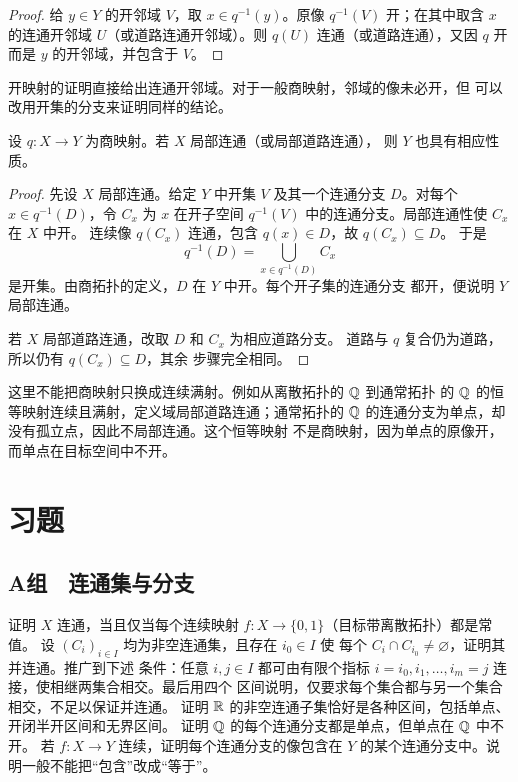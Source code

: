 \begin{proof}
给 \(y\in Y\) 的开邻域 \(V\)，取 \(x\in q^{-1}(y)\)。原像
\(q^{-1}(V)\) 开；在其中取含 \(x\) 的连通开邻域 \(U\)（或道路连通开邻域）。则 \(q(U)\) 连通（或道路连通），又因 \(q\) 开而是 \(y\) 的开邻域，并包含于 \(V\)。
\end{proof}

开映射的证明直接给出连通开邻域。对于一般商映射，邻域的像未必开，但
可以改用开集的分支来证明同样的结论。

\begin{theorem}[商映射保持局部连通性]
\label{thm:quotient-local-connectedness}
设 \(q:X\to Y\) 为商映射。若 \(X\) 局部连通（或局部道路连通），
则 \(Y\) 也具有相应性质。
\end{theorem}

\begin{proof}
先设 \(X\) 局部连通。给定 \(Y\) 中开集 \(V\) 及其一个连通分支
\(D\)。对每个 \(x\in q^{-1}(D)\)，令 \(C_x\) 为 \(x\) 在开子空间
\(q^{-1}(V)\) 中的连通分支。局部连通性使 \(C_x\) 在 \(X\) 中开。
连续像 \(q(C_x)\) 连通，包含 \(q(x)\in D\)，故 \(q(C_x)\subseteq D\)。
于是
\[
 q^{-1}(D)=\bigcup_{x\in q^{-1}(D)}C_x
\]
是开集。由商拓扑的定义，\(D\) 在 \(Y\) 中开。每个开子集的连通分支
都开，便说明 \(Y\) 局部连通。

若 \(X\) 局部道路连通，改取 \(D\) 和 \(C_x\) 为相应道路分支。
道路与 \(q\) 复合仍为道路，所以仍有 \(q(C_x)\subseteq D\)，其余
步骤完全相同。
\end{proof}

这里不能把商映射只换成连续满射。例如从离散拓扑的 \(\mathbb{Q}\) 到通常拓扑
的 \(\mathbb{Q}\) 的恒等映射连续且满射，定义域局部道路连通；通常拓扑的
\(\mathbb{Q}\) 的连通分支为单点，却没有孤立点，因此不局部连通。这个恒等映射
不是商映射，因为单点的原像开，而单点在目标空间中不开。

\section*{习题}

\subsection*{A组　连通集与分支}
\begin{enumerate}[label=\textbf{\thechapter.\arabic*.}]
 证明 \(X\) 连通，当且仅当每个连续映射 \(f:X\to\{0,1\}\)（目标带离散拓扑）都是常值。
 设 \((C_i)_{i\in I}\) 均为非空连通集，且存在 \(i_0\in I\) 使
 每个 \(C_i\cap C_{i_0}\ne\varnothing\)，证明其并连通。推广到下述
 条件：任意 \(i,j\in I\) 都可由有限个指标
 \(i=i_0,i_1,\ldots,i_m=j\) 连接，使相继两集合相交。最后用四个
 区间说明，仅要求每个集合都与另一个集合相交，不足以保证并连通。
 证明 \(\mathbb{R}\) 的非空连通子集恰好是各种区间，包括单点、开闭半开区间和无界区间。
 证明 \(\mathbb{Q}\) 的每个连通分支都是单点，但单点在 \(\mathbb{Q}\) 中不开。
 若 \(f:X\to Y\) 连续，证明每个连通分支的像包含在 \(Y\) 的某个连通分支中。说明一般不能把“包含”改成“等于”。
\end{enumerate}

